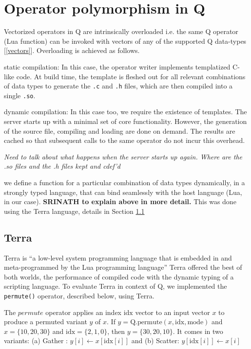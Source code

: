\section{Operator polymorphism in Q}

Vectorized operators in Q are intrinsically overloaded i.e. the same Q operator (Lua function) can be invoked with vectors of any of the supported Q data-types [\ref{vectors}].
Overloading is achieved as follows.
\be
\item static compilation: In this case, the operator writer implements
  templatized C-like code. At build time, the template is fleshed out for all
  relevant combinations of data types to generate the \verb+.c+ and \verb+.h+
  files, which are then compiled into a single \verb+.so+.
\item dynamic compilation: 
  In this case too, we require the existence of templates. 
  The server starts up with a minimal set of core functionality. 
  However, the generation of the source file, compiling and loading
  are done on demand. The results are cached
  so that subsequent calls to the same operator do not incur this overhead.

  {\em Need to talk about what happens when  the server starts up again. Where
  are the .so files and the .h files kept and cdef'd}

\item we define a function for a particular combination of data types
  dynamically, in a strongly typed language, that can bind seamlessly
  with the host language (Lua, in our case). 
  {\bf SRINATH to explain above in more detail.}
  This was done using the Terra
  language, details in Section \ref{Terra} 
  \ee

\subsection{Terra} 
\label{Terra} 
Terra is ``a low-level system programming language that is embedded in and
meta-programmed by the Lua programming language'' \cite{devito15xx}
Terra offered the best of both worlds, the performance of compiled code
with the dynamic typing of a scripting language.
To evaluate Terra in context of Q, we implemented the {\tt permute()} operator, described below, using Terra.

The \(permute\) operator applies an index \(\mathrm{idx}\) vector to an input vector \(x\)
to produce a permuted variant \(y\) of \(x\). 
If \(y = \mathrm{Q.permute}(x, \mathrm{idx}, \mathrm{mode})\) and \(x = \{10, 20, 30\}\) and
\(\mathrm{idx} = \{2, 1,
0\}\), then \(y = \{30, 20, 10\}\).
It comes in two variants:
(a) 
Gather : \(y[i] \leftarrow x[\mathrm{idx}[i]]\) and (b) 
Scatter: \(y[\mathrm{idx}[i]] \leftarrow x[i]\) 

